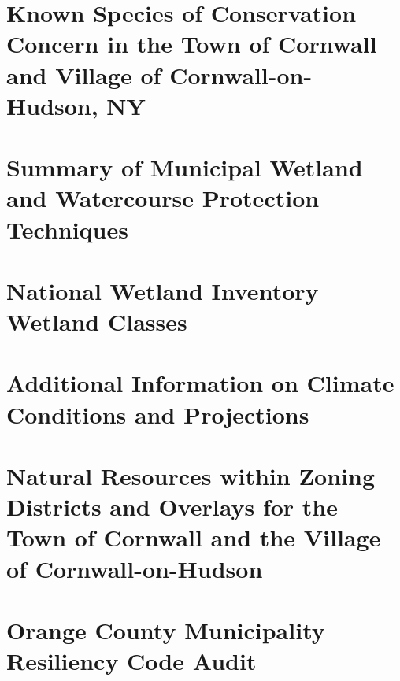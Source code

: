 \documentclass[11pt,fleqn, openany]{book} %
\begin{document}
\chapter{Known Species of Conservation Concern in the Town of Cornwall 
and Village of Cornwall-on-Hudson, NY}


\chapter{Summary of Municipal Wetland and Watercourse Protection Techniques}
\label{app:wetland_protection}

\chapter{National Wetland Inventory Wetland Classes}
\label{app:cornwall_wetlands}

\chapter{Additional Information on Climate Conditions and Projections}
\label{app:climate_projection}

\chapter{Natural Resources within Zoning Districts and Overlays for the Town 
of Cornwall and the Village of Cornwall-on-Hudson}
\label{app:zoning}

\chapter{Orange County Municipality Resiliency Code Audit}
\label{app:oc_resiliency}

\end{document}
